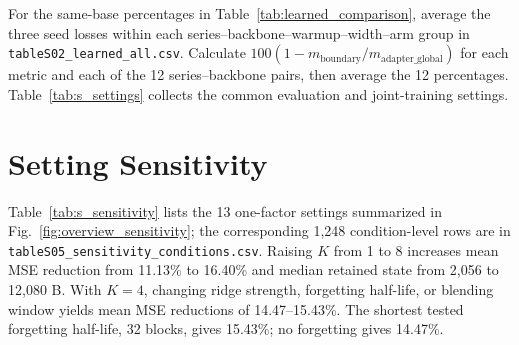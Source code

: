 For the same-base percentages in Table~\ref{tab:learned_comparison}, average the three seed losses within each series--backbone--warmup--width--arm group in \texttt{tableS02\_\allowbreak learned\_\allowbreak all.csv}. Calculate $100(1-m_{\mathrm{boundary}}/m_{\mathrm{adapter\_global}})$ for each metric and each of the 12 series--backbone pairs, then average the 12 percentages. Table~\ref{tab:s_settings} collects the common evaluation and joint-training settings.


\FloatBarrier

\section{Setting Sensitivity}
\label{app:sensitivity}

Table~\ref{tab:s_sensitivity} lists the 13 one-factor settings summarized in Fig.~\ref{fig:overview_sensitivity}; the corresponding 1,248 condition-level rows are in \texttt{tableS05\_\allowbreak sensitivity\_\allowbreak conditions.csv}. Raising $K$ from 1 to 8 increases mean MSE reduction from 11.13\% to 16.40\% and median retained state from 2,056 to 12,080 B. With $K=4$, changing ridge strength, forgetting half-life, or blending window yields mean MSE reductions of 14.47--15.43\%. The shortest tested forgetting half-life, 32 blocks, gives 15.43\%; no forgetting gives 14.47\%.

\begin{table}[H]
\caption{One-factor sensitivity on 96 fixed-base conditions. Percentages average condition-wise reductions from Static with global blending; bytes are median retained arrays. Other settings match the reference.}
\label{tab:s_sensitivity}
\centering

\end{table}
